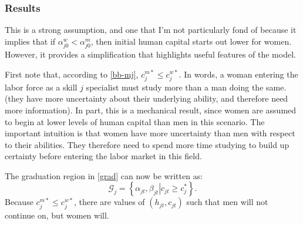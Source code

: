 \documentclass[10 pt]{article}
\begin{document}
\subsubsection{Results}

\begin{outline}



This is a strong assumption, and one that I'm not particularly fond of because it implies that if $\alpha_{j0}^w < \alpha_{j0}^m$, then initial human capital starts out lower for women. 
However, it provides a simplification that highlights useful features of the model. 

\begin{blist}

\item First note that, according to \eqref{bb-mj}, $c_j^{m*} \leq c_j^{w*}$. 
In words, a woman entering the labor force as a skill $j$ specialist must study more than a man doing the same.  (they have more uncertainty about their underlying ability, and therefore need more information).
In part, this is a mechanical result, since women are assumed to begin at lower levels of human capital than men in this scenario. 
The important intuition is that women have more uncertainty than men with respect to their abilities.
They therefore need to spend more time studying to build up certainty before entering the labor market in this field. 




\item The graduation region in \eqref{grad} can now be written as:
\begin{equation*}
	\mathcal{G}_j = \left\{ \alpha_{jt}, \beta_{jt} \left\vert c_{jt} \geq c_j^* \right. \right\}.
\end{equation*}
Because $c_j^{m*} \leq c_j^{w*}$, there are values of $(h_{jt}, c_{jt})$ such that men will not continue on, but women will. 


\end{blist}
\end{outline}
\end{document}
